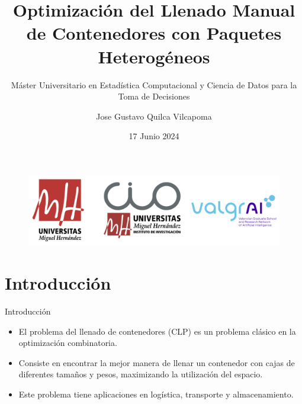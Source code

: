 \documentclass{beamer}
\author[Gustavo Quilca]{Jose Gustavo Quilca Vilcapoma}
\title{Optimización del Llenado Manual de Contenedores con Paquetes Heterogéneos}
\subtitle{Máster Universitario en Estadística Computacional y Ciencia de Datos para la Toma de Decisiones}
\institute[CIO - UMH]{
    Instituto Centro de Investigación Operativa \\
    Universidad Miguel Hernández
}
\date{\small 17 Junio 2024}
\begin{document}
\begin{frame}
    \titlepage
    \vspace*{-0.6cm}
    \begin{figure}[htpb]
        \begin{center}
            \includegraphics[keepaspectratio, scale=0.04]{pic/logos.png}
        \end{center}
    \end{figure}
\end{frame}

\begin{frame}
    \tableofcontents[sectionstyle=show,
        subsectionstyle=show/shaded/hide,
        subsubsectionstyle=show/shaded/hide]
\end{frame}

\section{Introducción}

\begin{frame}{Introducción}
    \begin{itemize}[<+-| alert@+>] %
        \item El problema del llenado de contenedores (CLP) es un
              problema clásico en la optimización combinatoria.
        \item Consiste en encontrar la mejor manera de llenar un contenedor con cajas de diferentes tamaños y pesos, maximizando la utilización del espacio.
        \item Este problema tiene aplicaciones en logística, transporte y
              almacenamiento.
    \end{itemize}
\end{frame}
\end{document}
